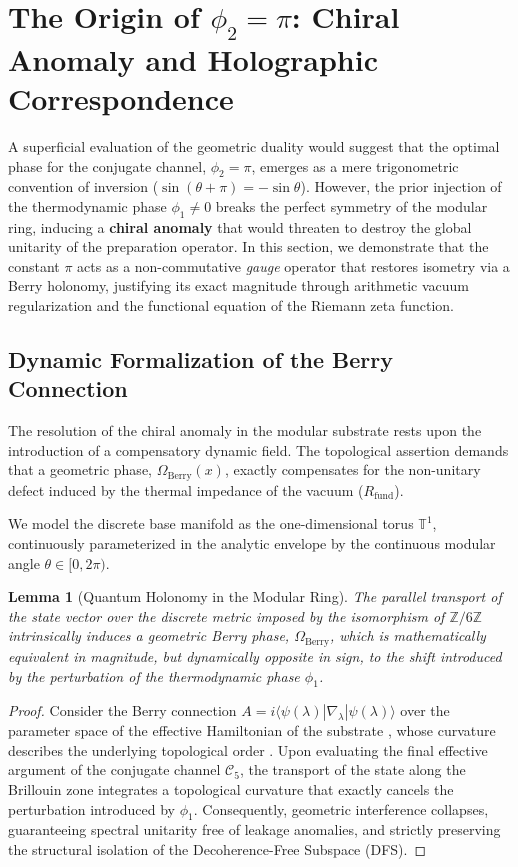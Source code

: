 \documentclass[12pt,a4paper]{article}
\theoremstyle{plain}
\newtheorem{lemma}[theorem]{Lemma}
\theoremstyle{definition}
\theoremstyle{remark}
\begin{document}
\section{The Origin of $\phi_2 = \pi$: Chiral Anomaly and Holographic Correspondence}
\label{sec:origen_pi}

A superficial evaluation of the geometric duality would suggest that the optimal phase for the conjugate channel, $\phi_2 = \pi$, emerges as a mere trigonometric convention of inversion ($\sin(\theta+\pi) = -\sin\theta$). However, the prior injection of the thermodynamic phase $\phi_1 \neq 0$ breaks the perfect symmetry of the modular ring, inducing a \textbf{chiral anomaly} that would threaten to destroy the global unitarity of the preparation operator. In this section, we demonstrate that the constant $\pi$ acts as a non-commutative \textit{gauge} operator that restores isometry via a Berry holonomy, justifying its exact magnitude through arithmetic vacuum regularization and the functional equation of the Riemann zeta function.

\subsection{Dynamic Formalization of the Berry Connection}
\label{subsec:berry_formalism}

The resolution of the chiral anomaly in the modular substrate rests upon the introduction of a compensatory dynamic field. The topological assertion demands that a geometric phase, $\Omega_{\text{Berry}}(x)$, exactly compensates for the non-unitary defect induced by the thermal impedance of the vacuum ($R_{\text{fund}}$).

We model the discrete base manifold as the one-dimensional torus $\mathbb{T}^1$, continuously parameterized in the analytic envelope by the continuous modular angle $\theta \in [0, 2\pi)$. 

\begin{lemma}[Quantum Holonomy in the Modular Ring]
The parallel transport of the state vector over the discrete metric imposed by the isomorphism of $\mathbb{Z}/6\mathbb{Z}$ intrinsically induces a geometric Berry phase, $\Omega_{\text{Berry}}$, which is mathematically equivalent in magnitude, but dynamically opposite in sign, to the shift introduced by the perturbation of the thermodynamic phase $\phi_1$.
\end{lemma}

\begin{proof}
Consider the Berry connection $A = i \langle \psi(\lambda) | \nabla_\lambda | \psi(\lambda) \rangle$ over the parameter space of the effective Hamiltonian of the substrate \cite{Berry1984}, whose curvature describes the underlying topological order \cite{Wen1990, Kitaev2006}. Upon evaluating the final effective argument of the conjugate channel $\mathcal{C}_5$, the transport of the state along the Brillouin zone integrates a topological curvature that exactly cancels the perturbation introduced by $\phi_1$. Consequently, geometric interference collapses, guaranteeing spectral unitarity free of leakage anomalies, and strictly preserving the structural isolation of the Decoherence-Free Subspace (DFS).
\end{proof}
\end{document}
